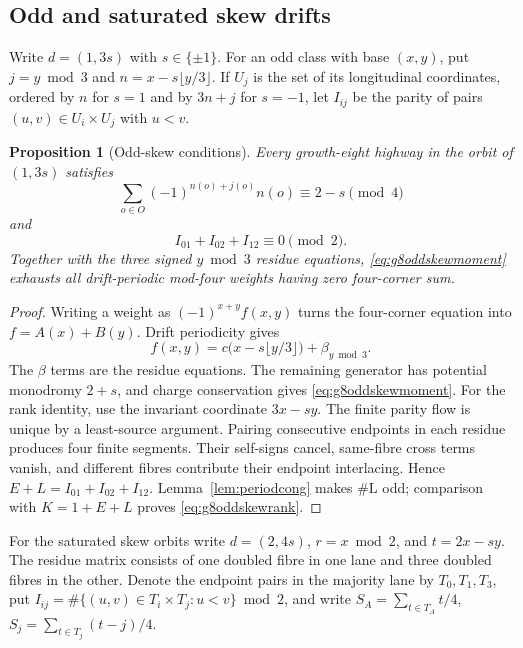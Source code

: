 \documentclass[11pt,letterpaper]{article}
\theoremstyle{plain}
\newtheorem{proposition}[theorem]{Proposition}
\theoremstyle{definition}
\newcommand{\drift}{d}
\newcommand{\turnL}{\mathrm{L}}
\begin{document}
\begin{NoHyper}
\subsection{Odd and saturated skew drifts}

Write $\drift=(1,3s)$ with $s\in\{\pm1\}$.  For an odd class with base $(x,y)$,
put $j=y\bmod3$ and $n=x-s\lfloor y/3\rfloor$.  If $U_j$ is the set of its
longitudinal coordinates, ordered by $n$ for $s=1$ and by $3n+j$ for $s=-1$,
let $I_{ij}$ be the parity of pairs $(u,v)\in U_i\times U_j$ with $u<v$.

\begin{proposition}[Odd-skew conditions]\label{prop:g8oddskew}
Every growth-eight highway in the orbit of $(1,3s)$ satisfies
\begin{equation}\label{eq:g8oddskewmoment}
 \sum_{o\in O}(-1)^{n(o)+j(o)}n(o)\equiv2-s\pmod4
\end{equation}
and
\begin{equation}\label{eq:g8oddskewrank}
 I_{01}+I_{02}+I_{12}\equiv0\pmod2.
\end{equation}
Together with the three signed $y\bmod3$ residue equations,
\eqref{eq:g8oddskewmoment} exhausts all drift-periodic mod-four weights having
zero four-corner sum.
\end{proposition}

\begin{proof}
Writing a weight as $(-1)^{x+y}f(x,y)$ turns the four-corner equation into
$f=A(x)+B(y)$.  Drift periodicity gives
\[
 f(x,y)=c\bigl(x-s\lfloor y/3\rfloor\bigr)+\beta_{y\bmod3}.
\]
The $\beta$ terms are the residue equations.  The remaining generator has
potential monodromy $2+s$, and charge conservation gives
\eqref{eq:g8oddskewmoment}.  For the rank identity, use the invariant coordinate
$3x-sy$.  The finite parity flow is unique by a least-source argument.
Pairing consecutive endpoints in each residue produces four finite segments.
Their self-signs cancel, same-fibre cross terms vanish, and different fibres
contribute their endpoint interlacing.  Hence
$E+L=I_{01}+I_{02}+I_{12}$.  Lemma~\ref{lem:periodcong} makes
$\#\turnL$ odd; comparison with $K=1+E+L$ proves
\eqref{eq:g8oddskewrank}.
\end{proof}

For the saturated skew orbits write $\drift=(2,4s)$, $r=x\bmod2$, and
$t=2x-sy$.  The residue matrix consists of one doubled fibre in one lane and
three doubled fibres in the other.  Denote the endpoint pairs in the majority
lane by $T_0,T_1,T_3$, put
$I_{ij}=\#\{(u,v)\in T_i\times T_j:u<v\}\bmod2$, and write
$S_A=\sum_{t\in T_A}t/4$, $S_j=\sum_{t\in T_j}(t-j)/4$.


\end{NoHyper}
\end{document}
